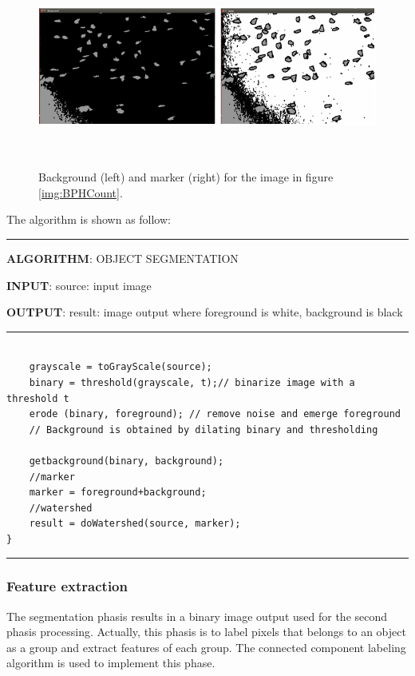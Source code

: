 \documentclass[10pt,a4paper]{article}
\begin{document}
\begin{figure}[ht]
\centering
\includegraphics[width=6.2in,height=2.6in]{img/backgroundmarker.png}
\caption{Background (left) and marker (right) for the image in figure \ref{img:BPHCount}.}
\label{img:backgroundmarker}
\end{figure}

The algorithm is shown as follow:

\noindent\rule{16cm}{0.5pt}

\textbf{ALGORITHM}: OBJECT SEGMENTATION

\textbf{INPUT}: source: input image
                  
\textbf{OUTPUT}: result: image output where foreground is white, background is black

\noindent\rule{16cm}{0.5pt}

\lstset{language=C++}
\begin{lstlisting}[basicstyle=\small]

	grayscale = toGrayScale(source);
	binary = threshold(grayscale, t);// binarize image with a threshold t
	erode (binary, foreground); // remove noise and emerge foreground
	// Background is obtained by dilating binary and thresholding
	
	getbackground(binary, background);	
	//marker
	marker = foreground+background;	
	//watershed
	result = doWatershed(source, marker);
}
\end{lstlisting}
\noindent\rule{16cm}{0.5pt}

\subsubsection {Feature extraction} 

The segmentation phasis results in a binary image output used for the second phasis processing. 
Actually, this phasis is to label pixels that belongs to an object as a group and extract features of each group. The connected component labeling algorithm \cite{CCL} is used to implement this phase. 
\end{document}
